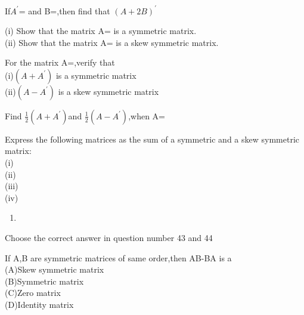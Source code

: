 \item If$ A^{'}$= and B=,then find that $(A+2B)^{'}$\\

  \item (i) Show that the matrix A= is a symmetric matrix.\\
  (ii) Show that the matrix A= is a skew symmetric matrix.\\
  \solution
  
  \item For the matrix A=,verify that\\
  (i)$(A+A^{'})$ is a symmetric matrix\\
  (ii)$(A-A^{'})$ is a skew symmetric matrix\\
  
  \item Find $\frac{1}{2}(A+A^{'}) $and $\frac{1}{2}(A-A^{'})$,when A=\\
  \item Express the following matrices as the sum of a symmetric and a skew symmetric matrix:\\
  (i)  \\(ii)  \\
  (iii) \\ (iv) \\
  \begin{enumerate}
    \item 
  \end{enumerate}
  Choose the correct answer in question number 43 and 44\\
  \item If A,B are symmetric matrices of same order,then AB-BA is a\\
  (A)Skew symmetric matrix \\(B)Symmetric matrix\\
  (C)Zero matrix \\ (D)Identity matrix\\
  
